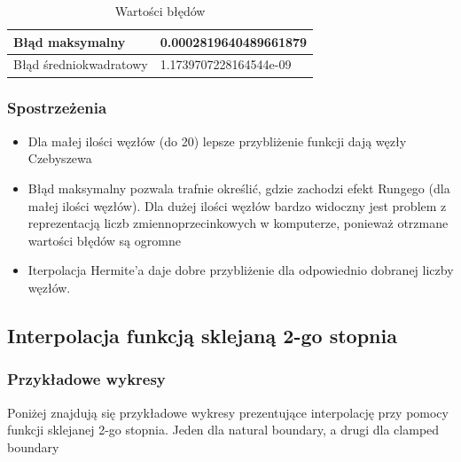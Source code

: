 \documentclass{article}
\begin{document}
\begin{table}[!ht]
    \centering
    \begin{tabular}{|l|l|}
    \hline
        Błąd maksymalny & 0.0002819640489661879 \\ \hline
        Błąd średniokwadratowy & 1.1739707228164544e-09 \\ \hline
    \end{tabular}
    \caption{Wartości błędów}
\end{table}

\subsubsection{Spostrzeżenia}

\begin{itemize}
\item Dla małej ilości węzłów (do 20) lepsze przybliżenie funkcji dają węzły Czebyszewa
\item Błąd maksymalny pozwala trafnie określić, gdzie zachodzi efekt Rungego (dla małej ilości węzłów). Dla dużej ilości węzłów bardzo widoczny jest problem z reprezentacją liczb zmiennoprzecinkowych w komputerze, ponieważ otrzmane wartości błędów są ogromne
\item Iterpolacja Hermite'a daje dobre przybliżenie dla odpowiednio dobranej liczby węzłów.
\end{itemize}

\subsection{Interpolacja funkcją sklejaną 2-go stopnia}

\subsubsection{Przykładowe wykresy}

\noindent
Poniżej znajdują się przykładowe wykresy prezentujące interpolację przy pomocy funkcji sklejanej 2-go stopnia. Jeden dla natural boundary, a drugi dla clamped boundary
\end{document}
